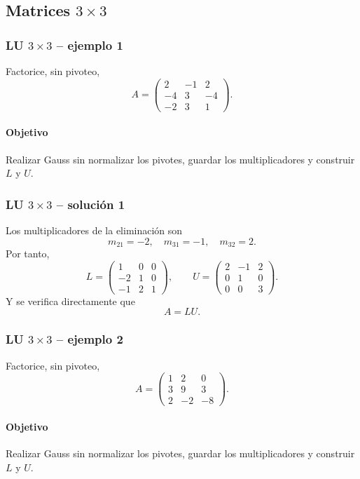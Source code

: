 \subsection{Matrices $3\times 3$}

\subsubsection*{LU $3\times 3$ -- ejemplo 1}

Factorice, sin pivoteo,
\[
A=\begin{pmatrix}2 & -1 & 2\\-4 & 3 & -4\\-2 & 3 & 1\end{pmatrix}.
\]

\paragraph{Objetivo}
Realizar Gauss sin normalizar los pivotes, guardar los multiplicadores y construir $L$ y $U$.



\subsubsection*{LU $3\times 3$ -- solución 1}

Los multiplicadores de la eliminación son
\[
m_{21}=-2,\quad m_{31}=-1,\quad m_{32}=2.
\]
Por tanto,
\[
L=\begin{pmatrix}1 & 0 & 0\\-2 & 1 & 0\\-1 & 2 & 1\end{pmatrix},\qquad U=\begin{pmatrix}2 & -1 & 2\\0 & 1 & 0\\0 & 0 & 3\end{pmatrix}.
\]
Y se verifica directamente que
\[
\boxed{A=LU}.
\]


\subsubsection*{LU $3\times 3$ -- ejemplo 2}

Factorice, sin pivoteo,
\[
A=\begin{pmatrix}1 & 2 & 0\\3 & 9 & 3\\2 & -2 & -8\end{pmatrix}.
\]

\paragraph{Objetivo}
Realizar Gauss sin normalizar los pivotes, guardar los multiplicadores y construir $L$ y $U$.




